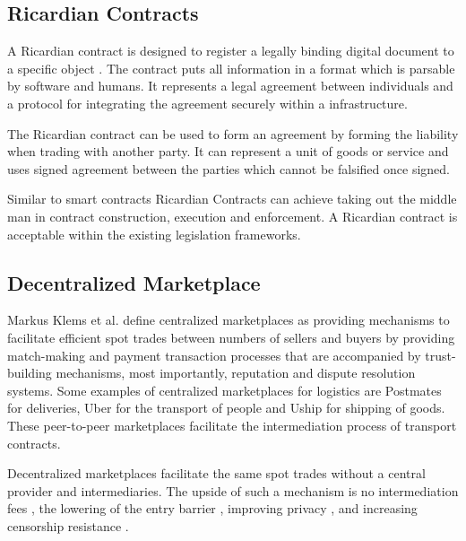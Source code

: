 \subsection{Ricardian Contracts}

A Ricardian contract is designed to register a legally binding digital document to a specific object \cite{grigg2004ricardian}. The contract puts all information in a format which is parsable by software and humans. It represents a legal agreement between individuals and a protocol for integrating the agreement securely within a infrastructure. \par
The Ricardian contract can be used to form an agreement by forming the liability when trading with another party. It can represent a unit of goods or service and uses signed agreement between the parties which cannot be falsified once signed. \par
Similar to smart contracts \cite{buterin2014next} Ricardian Contracts can achieve taking out the middle man in contract construction, execution and enforcement. A Ricardian contract is acceptable within the existing legislation frameworks.

\subsection{Decentralized Marketplace}

Markus Klems et al. define centralized marketplaces\cite{trustlessIntermediationInBCServiceMarket} as providing mechanisms to facilitate efficient spot trades between numbers of sellers and buyers by providing match-making and payment transaction processes that are accompanied by trust-building mechanisms, most importantly, reputation and dispute resolution systems. Some examples of centralized marketplaces for logistics are Postmates for deliveries, Uber for the transport of people and Uship for shipping of goods. These peer-to-peer marketplaces facilitate the intermediation process of transport contracts.\par
Decentralized marketplaces facilitate the same spot trades without a central provider and intermediaries. The upside of such a mechanism is no intermediation fees \cite{openbazaar}, the lowering of the entry barrier \cite{einav2016peer}, improving privacy \cite{decentralizedAnonymousReputation}, and increasing censorship resistance \cite{decentralMarket}.
